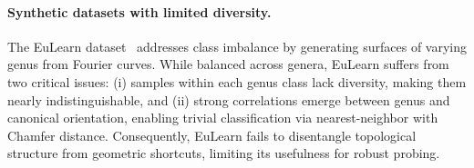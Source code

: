 \paragraph{Synthetic datasets with limited diversity.} 
The EuLearn dataset~\cite{eulearn} addresses class imbalance by generating surfaces of varying genus from Fourier curves. While balanced across genera, EuLearn suffers from two critical issues: (i) samples within each genus class lack diversity, making them nearly indistinguishable, and (ii) strong correlations emerge between genus and canonical orientation, enabling trivial classification via nearest-neighbor with Chamfer distance. Consequently, EuLearn fails to disentangle topological structure from geometric shortcuts, limiting its usefulness for robust probing.



